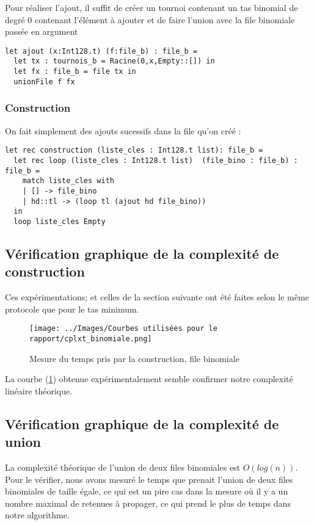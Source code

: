 \documentclass[12pt,a4paper]{article}
\begin{document}
Pour réaliser l'ajout, il suffit de créer un tournoi contenant un tas binomial de degré 0 contenant l'élément à ajouter et de faire l'union avec la file binomiale passée en argument 

\bigskip \begin{lstlisting}
let ajout (x:Int128.t) (f:file_b) : file_b =
  let tx : tournois_b = Racine(0,x,Empty::[]) in
  let fx : file_b = file tx in
  unionFile f fx 
\end{lstlisting} \bigskip

\subsubsection{Construction}
On fait simplement des ajouts sucessifs dans la file qu'on créé :
\bigskip \begin{lstlisting}
let rec construction (liste_cles : Int128.t list): file_b =
  let rec loop (liste_cles : Int128.t list)  (file_bino : file_b) : file_b = 
    match liste_cles with 
    | [] -> file_bino
    | hd::tl -> (loop tl (ajout hd file_bino))
  in
  loop liste_cles Empty
\end{lstlisting} \bigskip


\subsection{Vérification graphique de la complexité de construction}
Ces expérimentations; et celles de la section suivante ont été faites selon le même protocole que pour le tas minimum. 

\begin{figure}[hbtp]
\centering
\texttt{[image: ../Images/Courbes utilisées pour le rapport/cplxt\_binomiale.png]}
\caption{Mesure du temps pris par la construction, file binomiale}
\label{fig7}
\end{figure}


La courbe (\ref{fig7}) obtenue expérimentalement semble confirmer notre complexité linéaire théorique.

\subsection{Vérification graphique de la complexité de union}

La complexité théorique de l'union de deux files binomiales est $O(log (n))$. Pour le vérifier, nous avons mesuré le temps que prenait l'union de deux files binomiales de taille égale, ce qui est un pire cas dans la mesure où il y a un nombre maximal de retenues à propager, ce qui prend le plus de temps dans notre algorithme.
\end{document}

